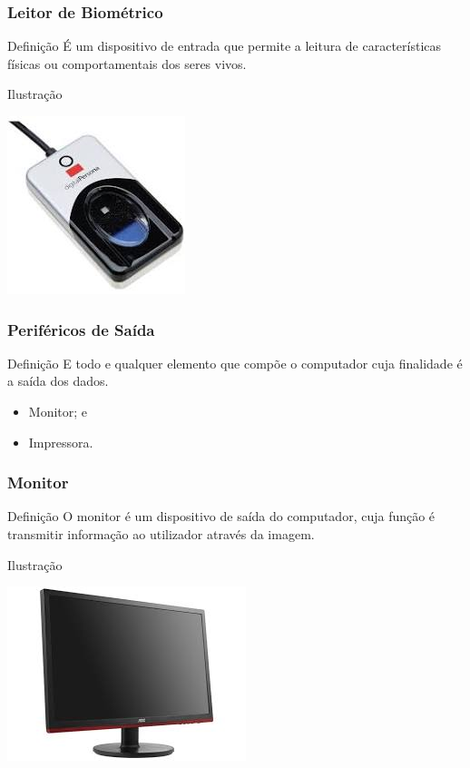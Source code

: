 \documentclass[aspectratio=169]{beamer} %
\begin{document}
\begin{frame}
	\frametitle{Leitor de Biométrico}
	
	\begin{block}{Defini\c cão}
		É um dispositivo de entrada que permite a leitura de características físicas ou comportamentais dos seres vivos.
	\end{block}\vfill
	
	\begin{exampleblock}{Ilustra\c cão}
		\begin{center}
			\includegraphics[scale=0.5]{img/leitor_biometrico}
		\end{center}		
	\end{exampleblock}
\end{frame}

\begin{frame}
	\frametitle{Periféricos de Saída}
	
	\begin{block}{Defini\c cão}
		E todo e qualquer elemento que compõe o computador cuja finalidade é a saída dos dados.
	\end{block}\vfill
	
	\begin{itemize}
		\item Monitor; e
		\item Impressora.
	\end{itemize}
\end{frame}

\begin{frame}
	\frametitle{Monitor}
	
	\begin{block}{Defini\c cão}
		O monitor é um dispositivo de saída do computador, cuja função é transmitir informação ao utilizador através da imagem.
	\end{block}\vfill
	
	\begin{exampleblock}{Ilustra\c cão}
		\begin{center}
			\includegraphics[scale=0.4]{img/monitor}
		\end{center}		
	\end{exampleblock}
\end{frame}
\end{document}
